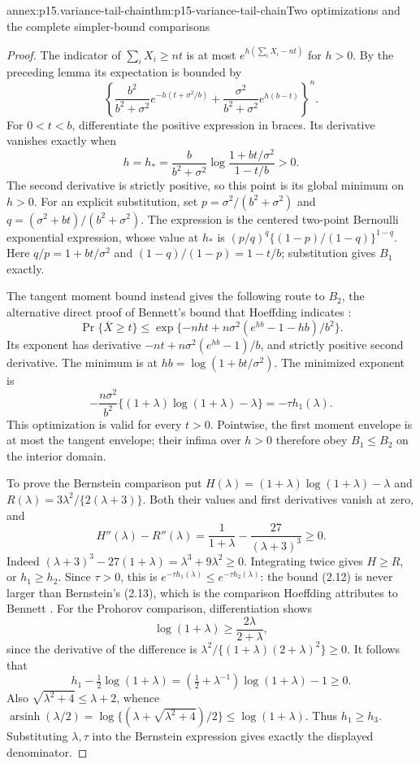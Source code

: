 \begin{annexitem}{annex:p15.variance-tail-chain}{thm:p15-variance-tail-chain}{Two optimizations and the complete simpler-bound comparisons}
\begin{proof}
The indicator of \(\sum_iX_i\geq nt\) is at most
\(e^{h(\sum_iX_i-nt)}\) for \(h>0\).
By the preceding lemma its expectation is bounded by
\[
 \left\{
 \frac{b^2}{b^2+\sigma^2}e^{-h(t+\sigma^2/b)}
 +\frac{\sigma^2}{b^2+\sigma^2}e^{h(b-t)}
 \right\}^{n}.
\]
For \(0<t<b\), differentiate the positive expression in braces.
Its derivative vanishes exactly when
\[
 h=h_*=\frac{b}{b^2+\sigma^2}
       \log\frac{1+bt/\sigma^2}{1-t/b}>0 .
\]
The second derivative is strictly positive, so this point is its
global minimum on \(h>0\).
For an explicit substitution, set
\(p=\sigma^2/(b^2+\sigma^2)\) and
\(q=(\sigma^2+bt)/(b^2+\sigma^2)\). The expression is the centered
two-point Bernoulli exponential expression, whose value at \(h_*\) is
\((p/q)^q\{(1-p)/(1-q)\}^{1-q}\).
Here \(q/p=1+bt/\sigma^2\) and
\((1-q)/(1-p)=1-t/b\); substitution gives \(B_1\) exactly.

The tangent moment bound instead gives the following route to
\(B_2\), the alternative direct proof of Bennett's bound that Hoeffding
indicates \cite[p.~24]{Hoeffding1963BoundedSums}:
\[
 \Pr\{\overline X\geq t\}
 \leq \exp\{-nht+n\sigma^2(e^{hb}-1-hb)/b^2\}.
\]
Its exponent has derivative
\(-nt+n\sigma^2(e^{hb}-1)/b\), and strictly positive second derivative.
The minimum is at \(hb=\log(1+bt/\sigma^2)\).
The minimized exponent is
\[
 -\frac{n\sigma^2}{b^2}
       \{(1+\lambda)\log(1+\lambda)-\lambda\}
 =-\tau h_1(\lambda).
\]
This optimization is valid for every \(t>0\).
Pointwise, the first moment envelope is at most the tangent envelope;
their infima over \(h>0\) therefore obey \(B_1\leq B_2\) on the
interior domain.

To prove the Bernstein comparison put
\(H(\lambda)=(1+\lambda)\log(1+\lambda)-\lambda\) and
\(R(\lambda)=3\lambda^2/\{2(\lambda+3)\}\).
Both their values and first derivatives vanish at zero, and
\[
 H''(\lambda)-R''(\lambda)
 =\frac1{1+\lambda}-\frac{27}{(\lambda+3)^3}\geq0.
\]
Indeed \((\lambda+3)^3-27(1+\lambda)=\lambda^3+9\lambda^2\geq0\).
Integrating twice gives \(H\geq R\), or \(h_1\geq h_2\).
Since \(\tau>0\), this is \(e^{-\tau h_1(\lambda)}\leq e^{-\tau h_2(\lambda)}\):
the bound (2.12) is never larger than Bernstein's (2.13), which is the
comparison Hoeffding attributes to Bennett
\cite[p.~17]{Hoeffding1963BoundedSums}.
For the Prohorov comparison, differentiation shows
\[
 \log(1+\lambda)\geq\frac{2\lambda}{2+\lambda},
\]
since the derivative of the difference is
\(\lambda^2/\{(1+\lambda)(2+\lambda)^2\}\geq0\).
It follows that
\[
 h_1-\tfrac12\log(1+\lambda)
 =(\tfrac12+\lambda^{-1})\log(1+\lambda)-1\geq0.
\]
Also \(\sqrt{\lambda^2+4}\leq\lambda+2\), whence
\(\operatorname{arsinh}(\lambda/2)
 =\log\{(\lambda+\sqrt{\lambda^2+4})/2\}\leq\log(1+\lambda)\).
Thus \(h_1\geq h_3\). Substituting \(\lambda,\tau\) into the
Bernstein expression gives exactly the displayed denominator.


\end{proof}
\end{annexitem}
